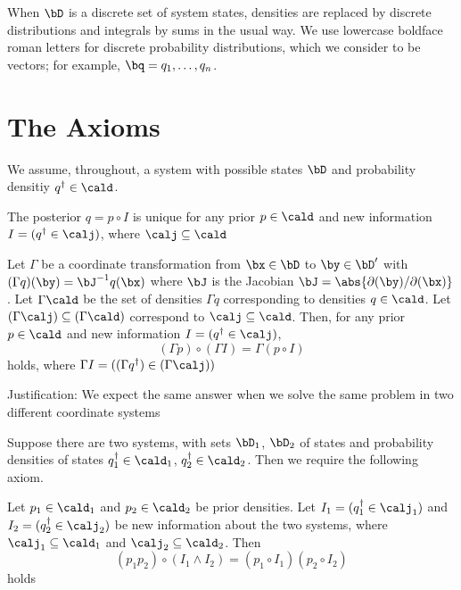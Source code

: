 \documentclass[11pt]{article}
\begin{document}
When \(\bD\) is a discrete set of system states, densities are replaced by discrete distributions and
integrals by sums in the usual way. We use lowercase boldface roman letters for discrete probability
distributions, which we consider to be vectors; for example, \(\bq=q_1,\dots,q_n\).
\section{The Axioms}
\label{sec:orgccec751}
We assume, throughout, a system with possible states \(\bD\) and probability densitiy
\(q^\dag\in\cald\).

\begin{axiom}[Uniqueness]
The posterior \(q=p\circ I\) is unique for any prior \(p\in\cald\) and new information
\(I=(q^\dag\in\calj)\), where \(\calj\subseteq\cald\)
\end{axiom}

\begin{axiom}[Invariance]
Let \(\Gamma\) be a coordinate transformation from \(\bx\in\bD\) to \(\by\in\bD'\) with
\((\Gamma q)(\by)=\bJ^{-1}q(\bx)\) where \(\bJ\) is the Jacobian \(\bJ=\abs{\partial(\by)/\partial(\bx)}\).
Let \(\Gamma\cald\) be the set of densities \(\Gamma q\) corresponding to densities \(q\in\cald\). Let
\((\Gamma\calj)\subseteq(\Gamma\cald)\) correspond to \(\calj\subseteq\cald\). Then, for any prior
\(p\in\cald\) and new information \(I=(q^\dag\in\calj)\),
\begin{equation*}
(\Gamma p)\circ(\Gamma I)=\Gamma(p\circ I)
\end{equation*}
holds, where \(\Gamma I=((\Gamma q^\dag)\in(\Gamma\calj))\)
\end{axiom}

Justification: We expect the same answer when we solve the same problem in two different coordinate systems

Suppose there are two systems, with sets \(\bD_1\), \(\bD_2\) of states and probability densities of
states \(q_1^\dag\in\cald_1\), \(q_2^\dag\in\cald_2\). Then we require the following axiom.
\begin{axiom}
Let \(p_1\in\cald_1\) and \(p_2\in\cald_2\) be prior densities. Let \(I_1=(q_1^\dag\in\calj_1)\) and
\(I_2=(q_2^\dag\in\calj_2)\) be new information about the two systems, where
\(\calj_1\subseteq\cald_1\) and \(\calj_2\subseteq\cald_2\). Then
\begin{equation*}
(p_1p_2)\circ(I_1\wedge I_2)=(p_1\circ I_1)(p_2\circ I_2)
\end{equation*}
holds
\end{axiom}
\end{document}

